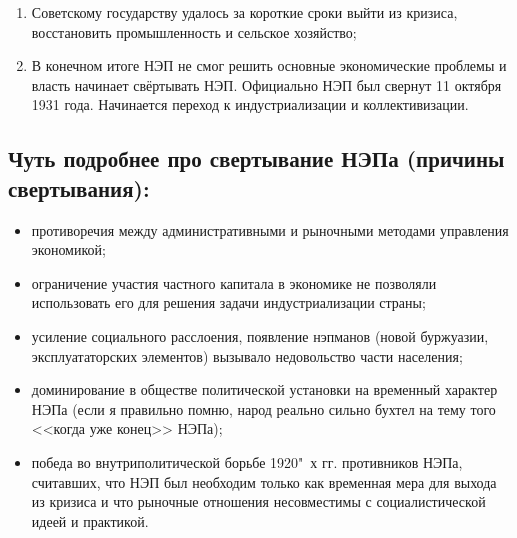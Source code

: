 \begin{enumerate}
    \item Советскому государству удалось за короткие сроки выйти из кризиса, восстановить промышленность и сельское хозяйство;
    \item В конечном итоге НЭП не смог решить основные экономические проблемы и власть начинает свёртывать НЭП. Официально НЭП был свернут 11 октября 1931 года. Начинается переход к индустриализации и коллективизации.
\end{enumerate}

\subsection{Чуть подробнее про свертывание НЭПа (причины свертывания):}

\begin{itemize}
    \item противоречия между административными и рыночными методами управления экономикой;
    \item ограничение участия частного капитала в экономике не позволяли использовать его для решения задачи индустриализации страны;
    \item усиление социального расслоения, появление нэпманов (новой буржуазии, эксплуататорских элементов) вызывало недовольство части населения;
    \item доминирование в обществе политической установки на временный характер НЭПа (если я правильно помню, народ реально сильно бухтел на тему того <<когда уже конец>> НЭПа);
    \item победа во внутриполитической борьбе 1920"~х гг. противников НЭПа, считавших, что НЭП был необходим только как временная мера для выхода из кризиса и что рыночные отношения несовместимы с социалистической идеей и практикой.
\end{itemize}



